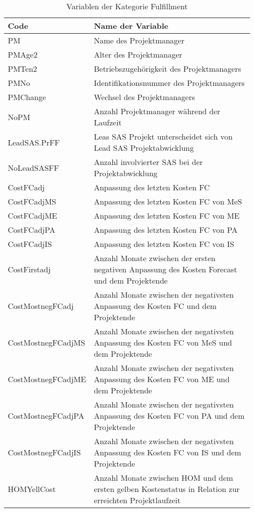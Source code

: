 \begin{longtable}[ht]{p{}p{}}
 	\caption{Variablen der Kategorie Fulfillment}\\
 	\toprule
		\textbf{Code} & \textbf{Name der Variable} \\  \endfirsthead\endhead
		\midrule
		PM    & Name des Projektmanager \\
		PMAge2 & Alter des Projektmanager \\
		PMTen2 & Betriebszugehörigkeit des Projektmanagers  \\
		PMNo  & Identifikationsnummer des Projektmanagers  \\
		PMChange & Wechsel des Projektmanagers \\
		NoPM  & Anzahl Projektmanager während der Laufzeit \\
		LeadSAS.PrFF & Leas SAS Projekt unterscheidet sich von Lead SAS Projektabwicklung \\
		NoLeadSASFF & Anzahl involvierter SAS bei der Projektabwicklung\\
		CostFCadj & Anpassung des letzten Kosten FC \\
		CostFCadjMS & Anpassung des letzten Kosten FC von MeS \\
		CostFCadjME & Anpassung des letzten Kosten FC von ME \\
		CostFCadjPA & Anpassung des letzten Kosten FC von PA \\
		CostFCadjIS & Anpassung des letzten Kosten FC von IS \\
		CostFirstadj & Anzahl Monate zwischen der ersten  negativen Anpassung des Kosten Forecast und dem Projektende \\
		CostMostnegFCadj & Anzahl Monate zwischen der negativsten Anpassung des Kosten FC und dem Projektende \\
		CostMostnegFCadjMS & Anzahl Monate zwischen der negativsten Anpassung des Kosten FC von MeS und dem Projektende  \\
		CostMostnegFCadjME & Anzahl Monate zwischen der negativsten Anpassung des Kosten FC von ME und dem Projektende  \\
		CostMostnegFCadjPA & Anzahl Monate zwischen der negativsten Anpassung des Kosten FC von PA und dem Projektende  \\
		CostMostnegFCadjIS & Anzahl Monate zwischen der negativsten Anpassung des Kosten FC von IS und dem Projektende  \\
		HOMYellCost & Anzahl Monate zwischen HOM und dem ersten gelben Kostenstatus in Relation zur erreichten Projektlaufzeit \\

\end{longtable}
